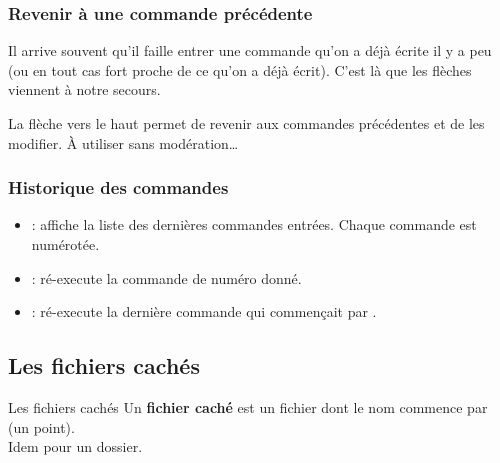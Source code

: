 \documentclass[a4paper,11pt]{style-esi/td}
\begin{document}
								
		\subsubsection*{Revenir à une commande précédente} 

			Il arrive souvent qu'il faille entrer une commande 
			qu'on a déjà écrite il y a peu 
			(ou en tout cas fort proche de ce qu'on a déjà écrit). 
			C'est là que les flèches viennent à notre secours.  
			
			La flèche vers le haut permet de revenir aux commandes précédentes 
			et de les modifier. À utiliser sans modération\dots  

		\subsubsection*{Historique des commandes} 
		
			\begin{itemize}
			\item {} : 
				affiche la liste des dernières commandes entrées.
				Chaque commande est numérotée.
			\item {} : 
				ré-execute la commande de numéro donné.
			\item {} : 
				ré-execute la dernière commande qui commençait par .
			\end{itemize}

	\subsection{Les fichiers cachés}

		\begin{theorie}{Les fichiers cachés}
			Un \textbf{fichier caché}
			est un fichier
			dont le nom commence par \og{}\fg{} (un point).
			\\
			Idem pour un dossier.
		\end{theorie}
\end{document}
